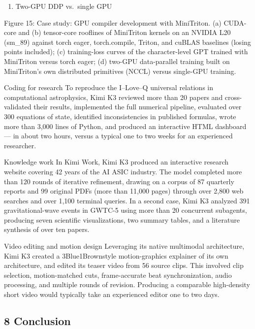 \documentclass[
  10
]{article}
\providecommand{\tightlist}{%
  \setlength{\itemsep}{0pt}\setlength{\parskip}{0pt}}
\begin{document}
\begin{enumerate}
\def\labelenumi{(\alph{enumi})}
\setcounter{enumi}{3}
\tightlist
\item
  Two-GPU DDP vs.~single GPU
\end{enumerate}

Figure 15: Case study: GPU compiler development with MiniTriton. (a)
CUDA-core and (b) tensor-core rooflines of MiniTriton kernels on an
NVIDIA L20 (sm\_89) against torch eager, torch.compile, Triton, and
cuBLAS baselines (losing points included); (c) training-loss curves of
the character-level GPT trained with MiniTriton versus torch eager; (d)
two-GPU data-parallel training built on MiniTriton's own distributed
primitives (NCCL) versus single-GPU training.

Coding for research To reproduce the I--Love--Q universal relations in
computational astrophysics, Kimi K3 reviewed more than 20 papers and
cross-validated their results, implemented the full numerical pipeline,
evaluated over 300 equations of state, identified inconsistencies in
published formulas, wrote more than 3,000 lines of Python, and produced
an interactive HTML dashboard --- in about two hours, versus a typical
one to two weeks for an experienced researcher.

Knowledge work In Kimi Work, Kimi K3 produced an interactive research
website covering 42 years of the AI ASIC industry. The model completed
more than 120 rounds of iterative refinement, drawing on a corpus of 87
quarterly reports and 99 original PDFs (more than 11,000 pages) through
over 2,800 web searches and over 1,100 terminal queries. In a second
case, Kimi K3 analyzed 391 gravitational-wave events in GWTC-5 using
more than 20 concurrent subagents, producing seven scientific
visualizations, two summary tables, and a literature synthesis of over
ten papers.

Video editing and motion design Leveraging its native multimodal
architecture, Kimi K3 created a 3Blue1Brownstyle motion-graphics
explainer of its own architecture, and edited its teaser video from 56
source clips. This involved clip selection, motion-matched cuts,
frame-accurate beat synchronization, audio processing, and multiple
rounds of revision. Producing a comparable high-density short video
would typically take an experienced editor one to two days.

\subsection{8 Conclusion}\label{conclusion}
\end{document}
